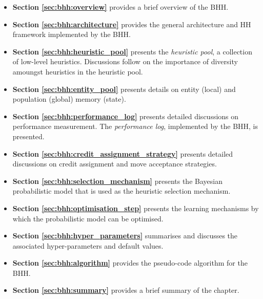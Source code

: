 \begin{itemize}
      \item \textbf{Section \ref{sec:bhh:overview}} provides a brief overview of the \Acs{BHH}.

      \item \textbf{Section \ref{sec:bhh:architecture}} provides the general architecture and \Ac{HH} framework implemented by the \Acs{BHH}.

      \item \textbf{Section \ref{sec:bhh:heuristic_pool}} presents the \textit{heuristic pool}, a collection of low-level heuristics. Discussions follow on the importance of diversity amoungst heuristics in the heuristic pool.

      \item \textbf{Section \ref{sec:bhh:entity_pool}} presents details on entity (local) and population (global) memory (state).

      \item \textbf{Section \ref{sec:bhh:performance_log}} presents detailed discussions on performance measurement. The \textit{performance log}, implemented by the \acs{BHH}, is presented.

      \item \textbf{Section \ref{sec:bhh:credit_assignment_strategy}} presents detailed discussions on credit assignment and move acceptance strategies.

      \item \textbf{Section \ref{sec:bhh:selection_mechanism}} presents the Bayesian probabilistic model that is used as the heuristic selection mechanism.

      \item \textbf{Section \ref{sec:bhh:optimisation_step}} presents the learning mechanisms by which the probabilistic model can be optimised.

      \item \textbf{Section \ref{sec:bhh:hyper_parameters}} summarises and discusses the associated hyper-parameters and default values.

      \item \textbf{Section \ref{sec:bhh:algorithm}} provides the pseudo-code algorithm for the \acs{BHH}.

      \item \textbf{Section \ref{sec:bhh:summary}} provides a brief summary of the chapter.
\end{itemize}


